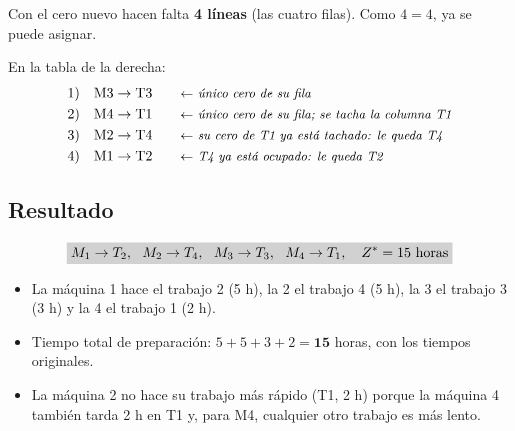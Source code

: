 \documentclass[11pt,a4paper]{article}
\newcommand{\marco}[3]{%
  \foreach \i in {2,...,#2} \foreach \j in {2,...,#3}
    \draw[gray!60, very thin] (#1-\i-\j.north west) rectangle (#1-\i-\j.south east);
  \draw[semithick] (#1-2-2.north west) rectangle (#1-#2-#3.south east);}
\newcommand{\tfila}[3]{\draw[tapa] (#1-#2-2.west) -- (#1-#2-#3.east);}
\newcommand{\pie}[2]{\node[below=1.5mm of #1, font=\scriptsize\itshape] {#2};}
\newcommand{\cero}[1]{\node[asig] at (#1) {};}
\newcommand{\flecha}[3]{\draw[-{Stealth[length=2.4mm]}, thick] (#1.east) -- node[above, font=\scriptsize, align=center] {#3} (#1.east -| #2.west);}
\begin{document}
\begin{center}
\end{center}
Con el cero nuevo hacen falta \textbf{4 líneas} (las cuatro filas). Como $4 = 4$, ya se puede asignar.

En la tabla de la derecha:
\begin{align*}
1)\quad & \text{M3} \to \text{T3} \nota{único cero de su fila}\\
2)\quad & \text{M4} \to \text{T1} \nota{único cero de su fila; se tacha la columna T1}\\
3)\quad & \text{M2} \to \text{T4} \nota{su cero de T1 ya está tachado: le queda T4}\\
4)\quad & \text{M1} \to \text{T2} \nota{T4 ya está ocupado: le queda T2}
\end{align*}

\subsection*{Resultado}
\[
\res{M_1 \to T_2,\ \ M_2 \to T_4,\ \ M_3 \to T_3,\ \ M_4 \to T_1,\quad Z^* = 15 \text{ horas}}
\]
\begin{itemize}[itemsep=2pt]
  \item La máquina 1 hace el trabajo 2 (5 h), la 2 el trabajo 4 (5 h), la 3 el trabajo 3 (3 h) y la 4 el trabajo 1 (2 h).
  \item Tiempo total de preparación: $5 + 5 + 3 + 2 = \mathbf{15}$ horas, con los tiempos originales.
  \item La máquina 2 no hace su trabajo más rápido (T1, 2 h) porque la máquina 4 también tarda 2 h en T1 y, para M4,
        cualquier otro trabajo es más lento.
\end{itemize}
\end{document}
